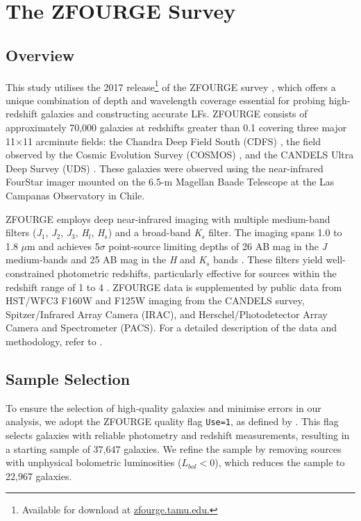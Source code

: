 \section{The ZFOURGE Survey} \label{Sec: The ZFOURGE Survey}
\subsection{Overview}
This study utilises the 2017 release\footnote{Available for download at \href{https://zfourge.tamu.edu/}{zfourge.tamu.edu.}} of the ZFOURGE survey \citep{straatman_fourstar_2016}, which offers a unique combination of depth and wavelength coverage essential for probing high-redshift galaxies and constructing accurate LFs. ZFOURGE consists of approximately 70,000 galaxies at redshifts greater than 0.1 covering three major 11$\times$11 arcminute fields: the Chandra Deep Field South (CDFS) \citep{giacconi_chandra_2002}, the field observed by the Cosmic Evolution Survey (COSMOS) \citep{scoville_cosmic_2007}, and the CANDELS Ultra Deep Survey (UDS) \citep{lawrence_ukirt_2007}. These galaxies were observed using the near-infrared FourStar imager \citep{persson_fourstar_2013} mounted on the 6.5-m Magellan Baade Telescope at the Las Campanas Observatory in Chile. 

ZFOURGE employs deep near-infrared imaging with multiple medium-band filters (\textit{J}$_{1}$, \textit{J}$_2$, \textit{J}$_{3}$, \textit{H}$_{l}$, \textit{H}$_{s}$) and a broad-band \textit{K}$_{s}$ filter. The imaging spans 1.0 to 1.8 $\mu$m and achieves 5$\sigma$ point-source limiting depths of 26 AB mag in the \textit{J} medium-bands and 25 AB mag in the \textit{H} and \textit{K}$_{s}$ bands \citep{spitler_first_2012}. These filters yield well-constrained photometric redshifts, particularly effective for sources within the redshift range of 1 to 4 \citep{spitler_first_2012}. ZFOURGE data is supplemented by public data from HST/WFC3 F160W and F125W imaging from the CANDELS survey, Spitzer/Infrared Array Camera (IRAC), and Herschel/Photodetector Array Camera and Spectrometer (PACS). For a detailed description of the data and methodology, refer to \cite{straatman_fourstar_2016}.

\subsection{Sample Selection} \label{Sec: Sample Selection}
To ensure the selection of high-quality galaxies and minimise errors in our analysis, we adopt the ZFOURGE quality flag \texttt{Use=1}, as defined by \cite{straatman_fourstar_2016}. This flag selects galaxies with reliable photometry and redshift measurements, resulting in a starting sample of 37,647 galaxies. We refine the sample by removing sources with unphysical bolometric luminosities ($L_{bol} < 0$), which reduces the sample to 22,967 galaxies.

